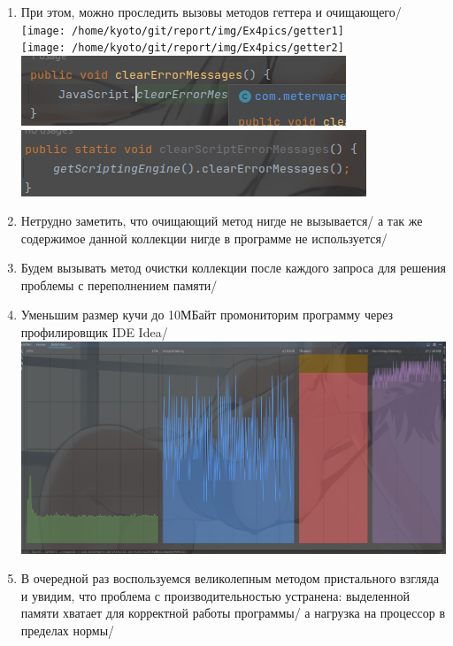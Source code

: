 \begin{enumerate}
    \item При этом, можно проследить вызовы методов геттера и очищающего/\\
    \texttt{[image: /home/kyoto/git/report/img/Ex4pics/getter1]}\\
    \texttt{[image: /home/kyoto/git/report/img/Ex4pics/getter2]}\\
    \includegraphics[scale=0.5]{img/Ex4pics/clear1}\\
    \includegraphics[scale=0.5]{img/Ex4pics/clear2}\\
    \item Нетрудно заметить, что очищающий метод нигде не вызывается/ а так же содержимое данной коллекции нигде в программе не используется/
    \item Будем вызывать метод очистки коллекции после каждого запроса для решения проблемы с переполнением памяти/
    \item Уменьшим размер кучи до 10МБайт промониторим программу через профилировщик IDE Idea/\\
    \includegraphics[scale=0.2]{img/Ex4pics/good}

    \newpage

    \thispagestyle{empty}

    \BgThispage

    \item В очередной раз воспользуемся великолепным методом пристального взгляда и увидим, что проблема с производительностью устранена: выделенной памяти
    хватает для корректной работы программы/ а нагрузка на процессор в пределах нормы/
\end{enumerate}


